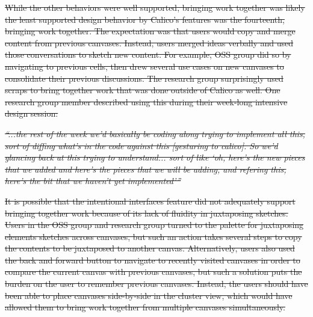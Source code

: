 \documentclass[12pt,fleqn]{ucithesis}
\providecommand{\DIFdeltex}[1]{{\protect\color{red}\sout{#1}}}                      %
\providecommand{\DIFdel}[1]{\texorpdfstring{\DIFdeltex{#1}}{}} %
\begin{document}

\DIFdel{While the other behaviors were well supported, bringing work together was likely the least supported design behavior by Calico's features was the fourteenth, bringing work together. The expectation was that users would copy and merge content from previous canvases. Instead, users merged ideas verbally and used those conversations to sketch new content. For example, OSS group did so by navigating to previous cells, then drew several use cases on new canvases to consolidate their previous discussions. The research group surprisingly used scraps to bring together work that was done outside of Calico as well. One research group member described using this during their week-long intensive design session: 
}%

\DIFdel{\emph{``...the rest of the week we'd basically be coding along trying to implement all this, sort of diffing what's in the code against this [gesturing to calico]. So we'd glancing back at this trying to understand... sort of like `oh, here's the new pieces that we added and here's the pieces that we will be adding, and refering this, here's the bit that we haven't yet implemented'''}
}%

\DIFdel{It is possible that the intentional interfaces feature did not adequately support bringing together work because of its lack of fluidity in juxtaposing sketches. Users in the OSS group and research group turned to the palette for juxtaposing elements sketches across canvases, but such an action takes several steps to copy the contents to be juxtaposed to another canvas. Alternatively, users also used the back and forward button to navigate to recently visited canvases in order to compare the current canvas with previous canvases, but such a solution puts the burden on the user to remember previous canvases. Instead, the users should have been able to place canvases side-by-side in the cluster view, which would have allowed them to bring work together from multiple canvases simultaneously.
}%

\end{document}
